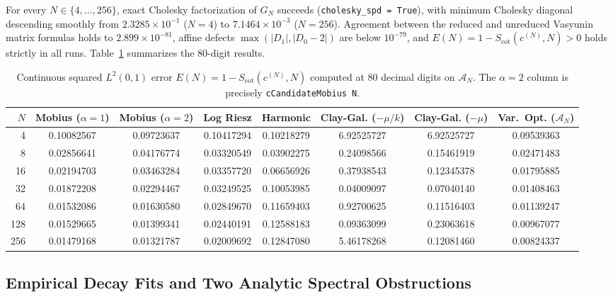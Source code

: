 \documentclass[11pt,a4paper]{article}
\theoremstyle{definition}
\begin{document}
For every $N \in \{4, \dots, 256\}$, exact Cholesky factorization of $G_N$ succeeds (\texttt{cholesky\_spd = True}), with minimum Cholesky diagonal descending smoothly from $2.3285 \times 10^{-1}$ ($N=4$) to $7.1464 \times 10^{-3}$ ($N=256$). Agreement between the reduced and unreduced Vasyunin matrix formulas holds to $2.899 \times 10^{-81}$, affine defects $\max(|D_1|, |D_0 - 2|)$ are below $10^{-79}$, and $E(N) = 1 - S_{\mathrm{cot}}(c^{(N)}, N) > 0$ holds strictly in all runs. Table~\ref{tab:benchmark} summarizes the $80$-digit results.

\begin{table}[h!]
\centering
\scriptsize
\setlength{\tabcolsep}{3.2pt}
\begin{tabular}{@{}rccccccc@{}}
\toprule
$N$ & \textbf{Mobius} ($\alpha=1$) & \textbf{Mobius} ($\alpha=2$) & \textbf{Log Riesz} & \textbf{Harmonic} & \textbf{Clay-Gal.} ($-\mu/k$) & \textbf{Clay-Gal.} ($-\mu$) & \textbf{Var.\ Opt.} ($\mathcal{A}_N$) \\
\midrule
4   & 0.10082567 & 0.09723637 & 0.10417294 & 0.10218279 & 6.92525727 & 6.92525727 & 0.09539363 \\
8   & 0.02856641 & 0.04176774 & 0.03320549 & 0.03902275 & 0.24098566 & 0.15461919 & 0.02471483 \\
16  & 0.02194703 & 0.03463284 & 0.03357720 & 0.06656926 & 0.37938543 & 0.12345378 & 0.01795885 \\
32  & 0.01872208 & 0.02294467 & 0.03249525 & 0.10053985 & 0.04009097 & 0.07040140 & 0.01408463 \\
64  & 0.01532086 & 0.01630580 & 0.02849670 & 0.11659403 & 0.92700625 & 0.11516403 & 0.01139247 \\
128 & 0.01529665 & 0.01399341 & 0.02440191 & 0.12588183 & 0.09363099 & 0.23063618 & 0.00967077 \\
256 & 0.01479168 & 0.01321787 & 0.02009692 & 0.12847080 & 5.46178268 & 0.12081460 & 0.00824337 \\
\bottomrule
\end{tabular}
\caption{Continuous squared $L^2(0, 1)$ error $E(N) = 1 - S_{\mathrm{cot}}(c^{(N)}, N)$ computed at $80$ decimal digits on $\mathcal{A}_N$. The $\alpha=2$ column is precisely \texttt{cCandidateMobius N}.}
\label{tab:benchmark}
\end{table}

\subsection{Empirical Decay Fits and Two Analytic Spectral Obstructions}
\end{document}
